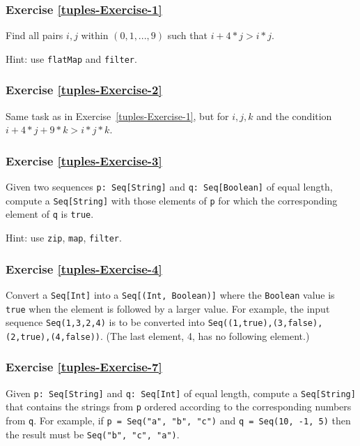 \subsubsection{Exercise \label{tuples-Exercise-1}\ref{tuples-Exercise-1}}

Find all pairs $i,j$ within $\left(0,1,...,9\right)$ such that $i+4*j>i*j$.

Hint: use \lstinline!flatMap! and \lstinline!filter!.

\subsubsection{Exercise \label{tuples-Exercise-2}\ref{tuples-Exercise-2}}

Same task as in Exercise~\ref{tuples-Exercise-1}, but for $i,j,k$
and the condition $i+4*j+9*k>i*j*k$.

\subsubsection{Exercise \label{tuples-Exercise-3}\ref{tuples-Exercise-3}}

Given two sequences \lstinline!p: Seq[String]! and \lstinline!q: Seq[Boolean]!
of equal length, compute a \lstinline!Seq[String]! with those elements
of \lstinline!p! for which the corresponding element of \lstinline!q!
is \lstinline!true!.

Hint: use \lstinline!zip!, \lstinline!map!, \lstinline!filter!.

\subsubsection{Exercise \label{tuples-Exercise-4}\ref{tuples-Exercise-4}}

Convert a \lstinline!Seq[Int]! into a \lstinline!Seq[(Int, Boolean)]!
where the \lstinline!Boolean! value is \lstinline!true! when the
element is followed by a larger value. For example, the input sequence
\lstinline!Seq(1,3,2,4)! is to be converted into \lstinline!Seq((1,true),(3,false),(2,true),(4,false))!.
(The last element, 4, has no following element.)

\subsubsection{Exercise \label{tuples-Exercise-7}\ref{tuples-Exercise-7}}

Given \lstinline!p: Seq[String]! and \lstinline!q: Seq[Int]! of
equal length, compute a \lstinline!Seq[String]! that contains the
strings from \lstinline!p! ordered according to the corresponding
numbers from \lstinline!q!. For example, if \lstinline!p = Seq("a", "b", "c")!
and \lstinline!q = Seq(10, -1, 5)! then the result must be \lstinline!Seq("b", "c", "a")!.

